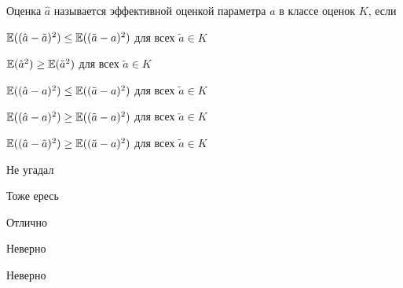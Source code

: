 
\begin{question}
Оценка \(\hat a\) называется эффективной оценкой параметра \(a\) в
классе оценок \(K\), если
\begin{answerlist}
  \item \(\operatorname{\mathbb{E}}((\hat a - \tilde a)^2) \leq \operatorname{\mathbb{E}}((\tilde a - a)^2)\) для всех
\(\tilde a \in K\)
  \item \(\operatorname{\mathbb{E}}(\hat a^2) \geq \operatorname{\mathbb{E}}(\tilde a ^2)\) для всех \(\tilde a \in K\)
  \item \(\operatorname{\mathbb{E}}((\hat a - a)^2) \leq \operatorname{\mathbb{E}}((\tilde a - a)^2)\) для всех
\(\tilde a \in K\)
  \item \(\operatorname{\mathbb{E}}((\hat a - a)^2) \geq \operatorname{\mathbb{E}}((\tilde a - a)^2)\) для всех
\(\tilde a \in K\)
  \item \(\operatorname{\mathbb{E}}((\hat a - \tilde a)^2) \geq \operatorname{\mathbb{E}}((\tilde a - a)^2)\) для всех
\(\tilde a \in K\)
\end{answerlist}
\end{question}

\begin{solution}
\begin{answerlist}
  \item Не угадал
  \item Тоже ересь
  \item Отлично
  \item Неверно
  \item Неверно
\end{answerlist}
\end{solution}

